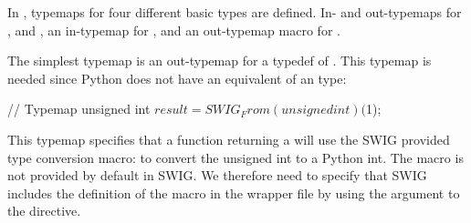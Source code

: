 In , typemaps for four different basic types
are defined. In- and out-typemaps for , and
, an in-typemap for , and an out-typemap
macro for \-\-.

The simplest typemap is an out-typemap for  a
typedef of . This typemap is needed since Python
does not have an equivalent of an  type:
\begin{swigcode}
{
  // Typemap unsigned int
  $result = SWIG_From(unsigned int)($1);
}
\end{swigcode}
This typemap specifies that a function returning a 
will use the SWIG provided type conversion macro:
 to convert the unsigned int to a Python
int. The macro is not provided by default in SWIG. We therefore need
to specify that SWIG includes the definition of the macro in the
wrapper file by using the  argument to the 
directive.

